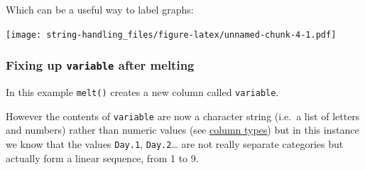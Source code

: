 \documentclass[]{article}
\newenvironment{Shaded}{\begin{snugshade}}{\end{snugshade}}
\newcommand{\KeywordTok}[1]{\textcolor[rgb]{0.13,0.29,0.53}{\textbf{#1}}}
\newcommand{\DataTypeTok}[1]{\textcolor[rgb]{0.13,0.29,0.53}{#1}}
\newcommand{\StringTok}[1]{\textcolor[rgb]{0.31,0.60,0.02}{#1}}
\newcommand{\OperatorTok}[1]{\textcolor[rgb]{0.81,0.36,0.00}{\textbf{#1}}}
\newcommand{\NormalTok}[1]{#1}
\theoremstyle{definition}
\theoremstyle{definition}
\theoremstyle{definition}
\theoremstyle{remark}
\begin{document}
Which can be a useful way to label graphs:

\begin{Shaded}
\end{Shaded}

\texttt{[image: string-handling\_files/figure-latex/unnamed-chunk-4-1.pdf]}

\subsubsection*{\texorpdfstring{Fixing up \texttt{variable} after
melting}{Fixing up variable after melting}}\label{separate-and-extract}

In this example \texttt{melt()} creates a new column called
\texttt{variable}.

\begin{Shaded}
\end{Shaded}

However the contents of \texttt{variable} are now a character string
(i.e.~a list of letters and numbers) rather than numeric values (see
\protect\hyperlink{factors-and-numerics}{column types}) but in this
instance we know that the values \texttt{Day.1}, \texttt{Day.2}\ldots{}
are not really separate categories but actually form a linear sequence,
from 1 to 9.
\end{document}
